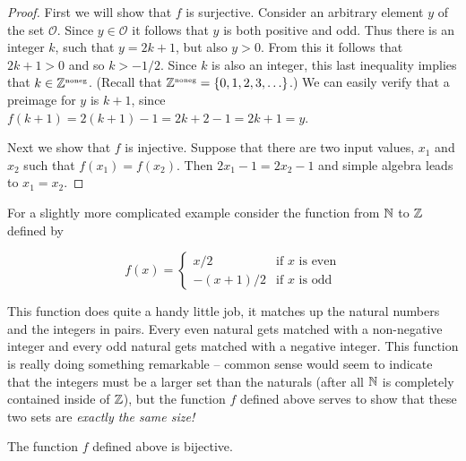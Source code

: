 \begin{proof}
First we will show that $f$ is surjective.  Consider an arbitrary element
$y$ of the set $\mathcal O$.  Since $y \in {\mathcal O}$ it follows that
$y$ is both positive and odd.  Thus there is an integer $k$, such that 
$y=2k+1$, but also $y>0$.  From this it follows that  $2k+1 >0$ and so
$k > -1/2$.  Since $k$ is also an integer, this last inequality implies
that $k \in {\mathbb Z}^{\mbox{\tiny noneg}}$.  (Recall that ${\mathbb Z}^{\mbox{\tiny noneg}} = \{0,1,2,3, \ldots \}$.)  We can easily verify that a preimage 
for $y$ is $k+1$, since $f(k+1) = 2(k+1)-1 = 2k+2-1 = 2k+1 = y$.
   
Next we show that $f$ is injective.  Suppose that there are two input
values, $x_1$ and $x_2$ such that $f(x_1) = f(x_2)$.  Then $2x_1-1 = 2x_2-1$
and simple algebra leads to $x_1=x_2$.
\end{proof}
 
For a slightly more complicated example 
consider the function from ${\mathbb N}$ to ${\mathbb Z}$ defined by

\[ f(x) = \left\{ \begin{array}{cl} x/2 & \mbox{if $x$ is even} \\ -(x+1)/2 & \mbox{if $x$ is odd} \end{array} \right. \]

This function does quite a handy little job, it matches up the natural
numbers and the integers in pairs.  Every even natural gets matched with
a non-negative integer and every odd natural gets matched with a 
negative integer.  This function is really doing 
something remarkable -- common sense would seem to indicate that the integers
must be a larger set than the naturals (after all ${\mathbb N}$ is completely
contained inside of ${\mathbb Z}$), but the function $f$ defined above serves
to show that these two sets are \emph{exactly the same size!}

\begin{thm}
The function $f$ defined above is bijective.
\end{thm}

